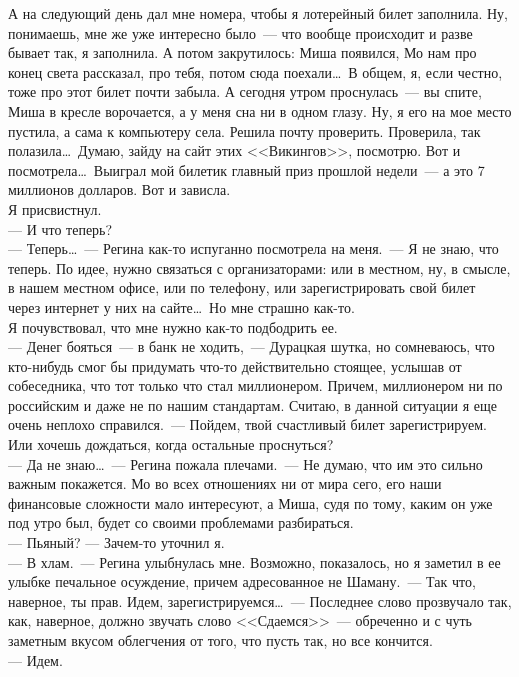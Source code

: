 А на следующий день дал мне номера, чтобы я лотерейный билет заполнила. Ну, 
понимаешь, мне же уже интересно было~--- что вообще происходит и разве бывает 
так, 
я заполнила. А потом закрутилось: Миша появился, Мо нам про конец света 
рассказал, про тебя, потом сюда поехали\ldots\ В общем, я, если честно, тоже 
про 
этот билет почти забыла. А сегодня утром проснулась~--- вы спите, Миша в кресле 
ворочается, а у меня сна ни в одном глазу. Ну, я его на мое место пустила, а 
сама к компьютеру села. Решила почту проверить. Проверила, так полазила\ldots\ 
Думаю, зайду на сайт этих <<Викингов>>, посмотрю. Вот и посмотрела\ldots\ 
Выиграл мой билетик главный приз прошлой недели~--- а это 7 миллионов долларов. Вот и 
зависла.\\
Я присвистнул.\\
--- И что теперь?\\
--- Теперь\ldots~--- Регина как-то испуганно посмотрела на меня.~--- Я не знаю, 
что теперь. По идее, нужно связаться с организаторами: или в местном, ну, в смысле, 
в нашем местном офисе, или по телефону, или зарегистрировать свой билет через 
интернет у них на сайте\ldots\ Но мне страшно как-то.\\
Я почувствовал, что мне нужно как-то подбодрить ее.\\
--- Денег бояться~--- в банк не ходить,~--- Дурацкая шутка, но сомневаюсь, что 
кто-нибудь смог бы придумать что-то действительно стоящее, услышав от 
собеседника, что тот только что стал миллионером. Причем, миллионером ни по 
российским и даже не по нашим стандартам. Считаю, в данной ситуации я еще очень 
неплохо справился.~--- Пойдем, твой счастливый билет зарегистрируем. Или хочешь 
дождаться, когда остальные проснуться?\\
--- Да не знаю\ldots~--- Регина пожала плечами.~--- Не думаю, что им это сильно 
важным покажется. Мо во всех отношениях ни от мира сего, его наши финансовые сложности 
мало интересуют, а Миша, судя по тому, каким он уже под утро был, будет со 
своими проблемами разбираться.\\
--- Пьяный? --- Зачем-то уточнил я.\\
--- В хлам.~--- Регина улыбнулась мне. Возможно, показалось, но я заметил в ее 
улыбке печальное осуждение, причем адресованное не Шаману.~--- Так что, 
наверное, ты прав. Идем, зарегистрируемся\ldots~--- Последнее слово прозвучало так, как, 
наверное, должно звучать слово <<Сдаемся>>~--- обреченно и с чуть заметным 
вкусом облегчения от того, что пусть так, но все кончится.\\
--- Идем.


